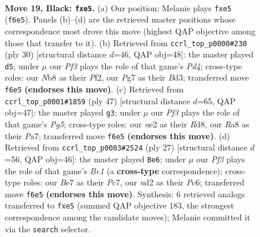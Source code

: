\documentclass[11pt]{article}
\begin{document}
\clearpage

\begin{figure}[p]\centering
\begin{subfigure}{0.46\textwidth}\centering
\resizebox{\linewidth}{!}{%
\newchessgame
\chessboard[
  setfen={rnb1k2r/pp2b1pp/5p2/3pPp1P/5P2/6P1/P2NN3/R1B1K2R b KQ - 0 19},
  showmover=false,
  pgfstyle=straightmove, color=movearrow, markmove={f6-e5}
]}
\caption{}
\end{subfigure}\hfill
\begin{subfigure}{0.46\textwidth}\centering
\resizebox{\linewidth}{!}{%
\newchessgame
\chessboard[
  setfen={r3k2r/p2nbppp/1p6/4p3/P1PP4/3BBP2/5P1P/R3K2R w KQkq - 0 16},
  showmover=false,
  pgfstyle=straightmove, color=movearrow, markmove={d4-d5}
]}
\caption{}
\end{subfigure}
\\[4pt]
\begin{subfigure}{0.46\textwidth}\centering
\resizebox{\linewidth}{!}{%
\newchessgame
\chessboard[
  setfen={1k1r4/pp3pb1/4b3/7p/1Pp2pp1/P1N2P2/4B1PP/1NR2K2 b - - 0 24},
  showmover=false,
  pgfstyle=straightmove, color=movearrow, markmove={g4-g3}
]}
\caption{}
\end{subfigure}\hfill
\begin{subfigure}{0.46\textwidth}\centering
\resizebox{\linewidth}{!}{%
\newchessgame
\chessboard[
  setfen={r1b1k2r/ppp2pp1/2p5/4P2p/6Pb/2N2P1P/PPP5/R1BR2K1 b - - 0 14},
  showmover=false,
  pgfstyle=straightmove, color=movearrow, markmove={c8-e6}
]}
\caption{}
\end{subfigure}
\caption{\textbf{Move 19, Black: \texttt{fxe5}.} (a) Our position; Melanie plays \texttt{fxe5} (\texttt{f6e5}). Panels (b)--(d) are the retrieved master positions whose correspondence most drove this move (highest QAP objective among those that transfer to it). (b) Retrieved from \texttt{ccrl\_top\_p0000\#230} (ply 30) [structural distance $d$=46, QAP obj=48]: the master played \texttt{d5}; under $\mu$ our \emph{Pf3} plays the role of that game's \emph{Pd4}; cross-type roles: our \emph{N}b8 as their \emph{P}f2, our \emph{P}g7 as their \emph{B}d3; transferred move \texttt{f6e5} \textbf{(endorses this move)}. (c) Retrieved from \texttt{ccrl\_top\_p0001\#1859} (ply 47) [structural distance $d$=65, QAP obj=47]: the master played \texttt{g3}; under $\mu$ our \emph{Pf3} plays the role of that game's \emph{Pg5}; cross-type roles: our \emph{n}e2 as their \emph{R}d8, our \emph{R}a8 as their \emph{P}a7; transferred move \texttt{f6e5} \textbf{(endorses this move)}. (d) Retrieved from \texttt{ccrl\_top\_p0003\#2524} (ply 27) [structural distance $d$=56, QAP obj=46]: the master played \texttt{Be6}; under $\mu$ our \emph{Pf3} plays the role of that game's \emph{Bc1} (a \textbf{cross-type} correspondence); cross-type roles: our \emph{B}e7 as their \emph{P}c7, our \emph{n}d2 as their \emph{P}c6; transferred move \texttt{f6e5} \textbf{(endorses this move)}. Synthesis: 6 retrieved analogs transferred to \texttt{fxe5} (summed QAP objective 183, the strongest correspondence among the candidate moves); Melanie committed it via the \texttt{search} selector.}
\label{fig:thought-m37}
\end{figure}
\end{document}
